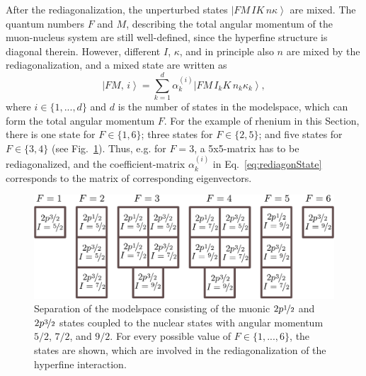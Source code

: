 After the rediagonalization, the unperturbed states $\left|FM\,IK\,n\kappa\right>$ are mixed. The quantum numbers $F$ and $M$, describing the total angular momentum of the muon-nucleus system are still well-defined, since the hyperfine structure is diagonal therein. However, different $I$, $\kappa$, and in principle also $n$ are mixed by the rediagonalization, and a mixed state are written as
\begin{equation}
\label{eq:rediagonState}
\left|FM,\,i\right> = \sum_{k=1}^d \alpha^{(i)}_k \left| FM\,I_kK\,n_k\kappa_k\right>,
\end{equation}
where $i\in \{1,...,d\}$ and $d$ is the number of states in the modelspace, which can form the total angular momentum $F$. For the example of rhenium in this Section, there is one state for $F\in \{1,6\}$; three states for $F\in\{2,5\}$; and five states for $F\in\{3,4\}$ (see Fig.~\ref{fig:blockRe}). Thus, e.g. for $F=3$, a 5x5-matrix has to be rediagonalized, and the coefficient-matrix $\alpha^{(i)}_k$ in Eq.~\eqref{eq:rediagonState} corresponds to the matrix of corresponding eigenvectors.
%
\begin{figure}%
\centering
\includegraphics[width=0.91\linewidth]{pics/blocksRe.pdf}%
\caption{Separation of the modelspace consisting of the muonic $2p\nicefrac{1}{2}$ and $2p\nicefrac{3}{2}$ states coupled to the nuclear states with angular momentum $5/2$, $7/2$, and $9/2$. For every possible value of $F\in \{1,...,6\}$, the states are shown, which are involved in the rediagonalization of the hyperfine interaction.}%
\label{fig:blockRe}%
\end{figure}
%
%
